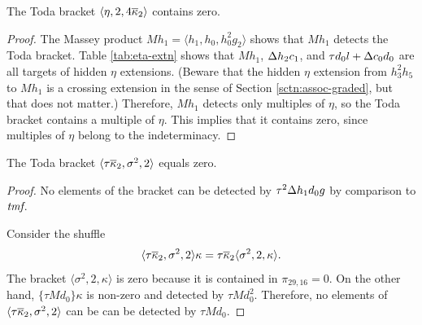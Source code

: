 
\begin{lemma}
\label{lem:eta,2,4kappabar2}
The Toda bracket
$\langle \eta, 2, 4 \overline{\kappa}_2 \rangle$
contains zero.
\end{lemma}

\begin{proof}
The Massey product $M h_1 = \langle h_1, h_0, h_0^2 g_2 \rangle$
shows that $M h_1$ detects the Toda bracket.
Table \ref{tab:eta-extn} shows that
$M h_1$, $\Delta h_2 c_1$, and $\tau d_0 l + \Delta c_0 d_0$ are all
targets of hidden $\eta$ extensions.
(Beware that the
hidden $\eta$ extension from $h_3^2 h_5$ to $M h_1$ is a crossing
extension in the sense of Section \ref{sctn:assoc-graded},
but that does not matter.)
Therefore, $M h_1$ detects only multiples of $\eta$,
so the Toda bracket contains a multiple of $\eta$.
This implies that it contains zero, since multiples of $\eta$
belong to the indeterminacy.
\end{proof}

\begin{lemma}
\label{lem:tkappabar2,sigma^2,2}
The Toda bracket $\langle \tau \overline{\kappa}_2, \sigma^2, 2 \rangle$
equals zero.
\end{lemma}

\begin{proof}
No elements of the bracket can
be detected by $\tau^2 \Delta h_1 d_0 g$ by comparison to $\textit{tmf}$.

Consider the shuffle
\[
\langle \tau \overline{\kappa}_2, \sigma^2, 2 \rangle \kappa =
\tau \overline{\kappa}_2 \langle \sigma^2, 2, \kappa \rangle.
\]
The bracket $\langle \sigma^2, 2, \kappa \rangle$ is zero
because it is contained in $\pi_{29,16} = 0$.
On the other hand,
$\{\tau M d_0\} \kappa$ is non-zero and detected by
$\tau M d_0^2$.
Therefore, no elements of
$\langle \tau \overline{\kappa}_2, \sigma^2, 2 \rangle$
can be can be detected by $\tau M d_0$.
\end{proof}

